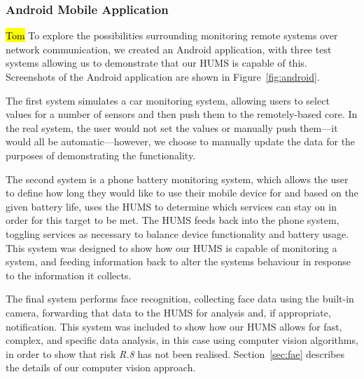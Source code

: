 \documentclass[10pt,a4paper]{article}
\begin{document}
\subsubsection{Android Mobile Application}
\hl{Tom}
To explore the possibilities surrounding monitoring remote systems over network communication, we created an Android application, with three test systems allowing us to demonstrate that our HUMS is capable of this. Screenshots of the Android application are shown in Figure~\ref{fig:android}.

The first system simulates a car monitoring system, allowing users to select values for a number of sensors and then push them to the remotely-based core. In the real system, the user would not set the values or manually push them---it would all be automatic---however, we choose to manually update the data for the purposes of demonstrating the functionality.

The second system is a phone battery monitoring system, which allows the user to define how long they would like to use their mobile device for and based on the given battery life, uses the HUMS to determine which services can stay on in order for this target to be met. The HUMS feeds back into the phone system, toggling services as necessary to balance device functionality and battery usage. This system was designed to show how our HUMS is capable of monitoring a system, and feeding information back to alter the systems behaviour in response to the information it collects.

The final system performs face recognition, collecting face data using the built-in camera, forwarding that data to the HUMS for analysis and, if appropriate, notification. This system was included to show how our HUMS allows for fast, complex, and specific data analysis, in this case using computer vision algorithms, in order to show that risk \emph{R.8} has not been realised. Section~\ref{sec:fae} describes the details of our computer vision approach.
\end{document}
